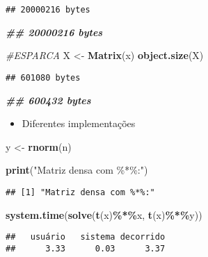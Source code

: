 \documentclass[
]{article}
\newenvironment{Shaded}{\begin{snugshade}}{\end{snugshade}}
\newcommand{\CommentTok}[1]{\textcolor[rgb]{0.56,0.35,0.01}{\textit{#1}}}
\newcommand{\DocumentationTok}[1]{\textcolor[rgb]{0.56,0.35,0.01}{\textbf{\textit{#1}}}}
\newcommand{\FunctionTok}[1]{\textcolor[rgb]{0.13,0.29,0.53}{\textbf{#1}}}
\newcommand{\NormalTok}[1]{#1}
\newcommand{\OtherTok}[1]{\textcolor[rgb]{0.56,0.35,0.01}{#1}}
\newcommand{\SpecialCharTok}[1]{\textcolor[rgb]{0.81,0.36,0.00}{\textbf{#1}}}
\newcommand{\StringTok}[1]{\textcolor[rgb]{0.31,0.60,0.02}{#1}}
\providecommand{\tightlist}{%
  \setlength{\itemsep}{0pt}\setlength{\parskip}{0pt}}
\begin{document}
\begin{verbatim}
## 20000216 bytes
\end{verbatim}

\begin{Shaded}
\begin{Highlighting}[]
\DocumentationTok{\#\# 20000216 bytes}

\CommentTok{\#ESPARCA}
\NormalTok{X }\OtherTok{\textless{}{-}} \FunctionTok{Matrix}\NormalTok{(x)}
\FunctionTok{object.size}\NormalTok{(X)}
\end{Highlighting}
\end{Shaded}

\begin{verbatim}
## 601080 bytes
\end{verbatim}

\begin{Shaded}
\begin{Highlighting}[]
\DocumentationTok{\#\# 600432 bytes}
\end{Highlighting}
\end{Shaded}

\begin{itemize}
\tightlist
\item
  Diferentes implementações
\end{itemize}

\begin{Shaded}
\begin{Highlighting}[]
\NormalTok{y }\OtherTok{\textless{}{-}} \FunctionTok{rnorm}\NormalTok{(n)}

\FunctionTok{print}\NormalTok{(}\StringTok{"Matriz densa com \%*\%:"}\NormalTok{)}
\end{Highlighting}
\end{Shaded}

\begin{verbatim}
## [1] "Matriz densa com %*%:"
\end{verbatim}

\begin{Shaded}
\begin{Highlighting}[]
\FunctionTok{system.time}\NormalTok{(}\FunctionTok{solve}\NormalTok{(}\FunctionTok{t}\NormalTok{(x)}\SpecialCharTok{\%*\%}\NormalTok{x, }\FunctionTok{t}\NormalTok{(x)}\SpecialCharTok{\%*\%}\NormalTok{y))}
\end{Highlighting}
\end{Shaded}

\begin{verbatim}
##   usuário   sistema decorrido 
##      3.33      0.03      3.37
\end{verbatim}
\end{document}
